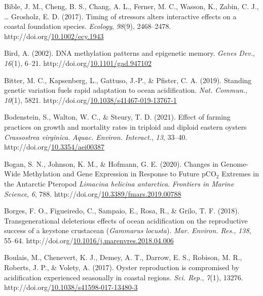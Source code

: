 \documentclass [11pt, proquest] {uwthesis}[2015/03/03]
\newlength{\cslhangindent}
\newenvironment{CSLReferences}%
{\setlength{\parindent}{0pt}%
\everypar{\setlength{\hangindent}{\cslhangindent}}\ignorespaces}%
{\par}
\begin{document}
\begin{CSLReferences}{1}{0}
\leavevmode\hypertarget{ref-Bible2017}{}%
Bible, J. M., Cheng, B. S., Chang, A. L., Ferner, M. C., Wasson, K., Zabin, C. J., \ldots{} Grosholz, E. D. (2017). {Timing of stressors alters interactive effects on a coastal foundation species}. \emph{Ecology}, \emph{98}(9), 2468--2478. http://doi.org/\href{https://doi.org/10.1002/ecy.1943}{10.1002/ecy.1943}

\leavevmode\hypertarget{ref-Bird2002}{}%
Bird, A. (2002). {DNA methylation patterns and epigenetic memory}. \emph{Genes Dev.}, \emph{16}(1), 6--21. http://doi.org/\href{https://doi.org/10.1101/gad.947102}{10.1101/gad.947102}

\leavevmode\hypertarget{ref-Bitter2019}{}%
Bitter, M. C., Kapsenberg, L., Gattuso, J.-P., \& Pfister, C. A. (2019). {Standing genetic variation fuels rapid adaptation to ocean acidification}. \emph{Nat. Commun.}, \emph{10}(1), 5821. http://doi.org/\href{https://doi.org/10.1038/s41467-019-13767-1}{10.1038/s41467-019-13767-1}

\leavevmode\hypertarget{ref-Bodenstein2021}{}%
Bodenstein, S., Walton, W. C., \& Steury, T. D. (2021). {Effect of farming practices on growth and mortality rates in triploid and diploid eastern oysters \emph{Crassostrea virginica}}. \emph{Aquac. Environ. Interact.}, \emph{13}, 33--40. http://doi.org/\href{https://doi.org/10.3354/aei00387}{10.3354/aei00387}

\leavevmode\hypertarget{ref-Bogan2020}{}%
Bogan, S. N., Johnson, K. M., \& Hofmann, G. E. (2020). {Changes in Genome-Wide Methylation and Gene Expression in Response to Future {pCO\(_2\)} Extremes in the Antarctic Pteropod \emph{Limacina helicina antarctica}}. \emph{Frontiers in Marine Science}, \emph{6}, 788. http://doi.org/\href{https://doi.org/10.3389/fmars.2019.00788}{10.3389/fmars.2019.00788}

\leavevmode\hypertarget{ref-Borges2018}{}%
Borges, F. O., Figueiredo, C., Sampaio, E., Rosa, R., \& Grilo, T. F. (2018). {Transgenerational deleterious effects of ocean acidification on the reproductive success of a keystone crustacean (\emph{Gammarus locusta})}. \emph{Mar. Environ. Res.}, \emph{138}, 55--64. http://doi.org/\href{https://doi.org/10.1016/j.marenvres.2018.04.006}{10.1016/j.marenvres.2018.04.006}

\leavevmode\hypertarget{ref-Boulais2017}{}%
Boulais, M., Chenevert, K. J., Demey, A. T., Darrow, E. S., Robison, M. R., Roberts, J. P., \& Volety, A. (2017). {Oyster reproduction is compromised by acidification experienced seasonally in coastal regions}. \emph{Sci. Rep.}, \emph{7}(1), 13276. http://doi.org/\href{https://doi.org/10.1038/s41598-017-13480-3}{10.1038/s41598-017-13480-3}


\end{CSLReferences}
\end{document}
